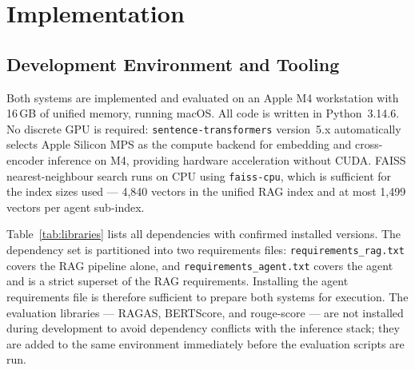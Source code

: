 
\chapter{Implementation}
\label{ch:implementation}

\section{Development Environment and Tooling}
\label{sec:devenv}

Both systems are implemented and evaluated on an Apple M4 workstation with 16\,GB of unified memory, running macOS. All code is written in Python~3.14.6. No discrete GPU is required: \texttt{sentence-transformers} version~5.x automatically selects Apple Silicon MPS as the compute backend for embedding and cross-encoder inference on M4, providing hardware acceleration without CUDA. FAISS nearest-neighbour search runs on CPU using \texttt{faiss-cpu}, which is sufficient for the index sizes used — 4,840 vectors in the unified RAG index and at most 1,499 vectors per agent sub-index.

Table~\ref{tab:libraries} lists all dependencies with confirmed installed versions. The dependency set is partitioned into two requirements files: \texttt{requirements\_rag.txt} covers the RAG pipeline alone, and \texttt{requirements\_agent.txt} covers the agent and is a strict superset of the RAG requirements. Installing the agent requirements file is therefore sufficient to prepare both systems for execution. The evaluation libraries — RAGAS, BERTScore, and rouge-score — are not installed during development to avoid dependency conflicts with the inference stack; they are added to the same environment immediately before the evaluation scripts are run.

